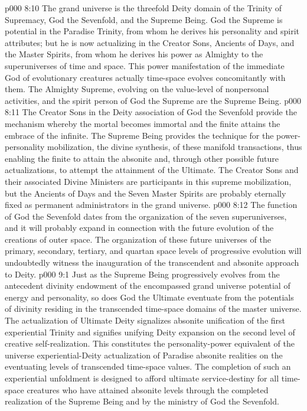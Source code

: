 \vs p000 8:10 \pc The grand universe is the threefold Deity domain of the Trinity of Supremacy, God the Sevenfold, and the Supreme Being. God the Supreme is potential in the Paradise Trinity, from whom he derives his personality and spirit attributes; but he is now actualizing in the Creator Sons, Ancients of Days, and the Master Spirits, from whom he derives his power as Almighty to the superuniverses of time and space. This power manifestation of the immediate God of evolutionary creatures actually time\hyp{}space evolves concomitantly with them. The Almighty Supreme, evolving on the value\hyp{}level of nonpersonal activities, and the spirit person of God the Supreme are  the Supreme Being.
\vs p000 8:11 The Creator Sons in the Deity association of God the Sevenfold provide the mechanism whereby the mortal becomes immortal and the finite attains the embrace of the infinite. The Supreme Being provides the technique for the power\hyp{}personality mobilization, the divine synthesis, of  these manifold transactions, thus enabling the finite to attain the absonite and, through other possible future actualizations, to attempt the attainment of the Ultimate. The Creator Sons and their associated Divine Ministers are participants in this supreme mobilization, but the Ancients of Days and the Seven Master Spirits are probably eternally fixed as permanent administrators in the grand universe.
\vs p000 8:12 The function of God the Sevenfold dates from the organization of the seven superuniverses, and it will probably expand in connection with the future evolution of the creations of outer space. The organization of these future universes of the primary, secondary, tertiary, and quartan space levels of progressive evolution will undoubtedly witness the inauguration of the transcendent and absonite approach to Deity.
\vs p000 9:1 Just as the Supreme Being progressively evolves from the antecedent divinity endowment of the encompassed grand universe potential of energy and personality, so does God the Ultimate eventuate from the potentials of divinity residing in the transcended time\hyp{}space domains of the master universe. The actualization of Ultimate Deity signalizes absonite unification of the first experiential Trinity and signifies unifying Deity expansion on the second level of creative self\hyp{}realization. This constitutes the personality\hyp{}power equivalent of the universe experiential\hyp{}Deity actualization of Paradise absonite realities on the eventuating levels of transcended time\hyp{}space values. The completion of such an experiential unfoldment is designed to afford ultimate service\hyp{}destiny for all time\hyp{}space creatures who have attained absonite levels through the completed realization of the Supreme Being and by the ministry of God the Sevenfold.
